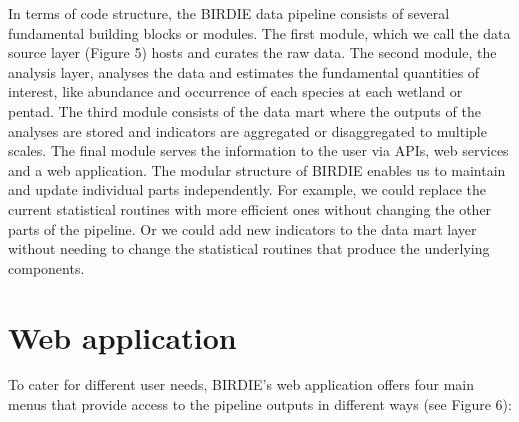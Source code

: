 \documentclass[utf8]{frontiersSCNS}
\begin{document}
In terms of code structure, the BIRDIE data pipeline consists of several
fundamental building blocks or modules. The first module, which we call
the data source layer (Figure 5) hosts and curates the raw data. The
second module, the analysis layer, analyses the data and estimates the
fundamental quantities of interest, like abundance and occurrence of
each species at each wetland or pentad. The third module consists of the
data mart where the outputs of the analyses are stored and indicators
are aggregated or disaggregated to multiple scales. The final module
serves the information to the user via APIs, web services and a web
application. The modular structure of BIRDIE enables us to maintain and
update individual parts independently. For example, we could replace the
current statistical routines with more efficient ones without changing
the other parts of the pipeline. Or we could add new indicators to the
data mart layer without needing to change the statistical routines that
produce the underlying components.

\hypertarget{web-application}{%
\section*{Web application}\label{web-application}}

To cater for different user needs, BIRDIE's web application offers four
main menus that provide access to the pipeline outputs in different ways
(see Figure 6):
\end{document}
